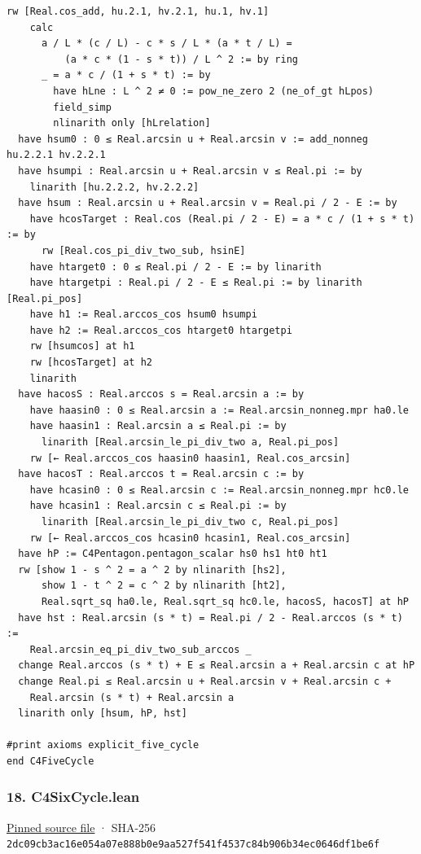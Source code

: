 \documentclass[11pt,a4paper]{article}
\begin{document}
\begin{Verbatim}[breaklines,breakanywhere,fontsize=\footnotesize]
    rw [Real.cos_add, hu.2.1, hv.2.1, hu.1, hv.1]
    calc
      a / L * (c / L) - c * s / L * (a * t / L) =
          (a * c * (1 - s * t)) / L ^ 2 := by ring
      _ = a * c / (1 + s * t) := by
        have hLne : L ^ 2 ≠ 0 := pow_ne_zero 2 (ne_of_gt hLpos)
        field_simp
        nlinarith only [hLrelation]
  have hsum0 : 0 ≤ Real.arcsin u + Real.arcsin v := add_nonneg hu.2.2.1 hv.2.2.1
  have hsumpi : Real.arcsin u + Real.arcsin v ≤ Real.pi := by
    linarith [hu.2.2.2, hv.2.2.2]
  have hsum : Real.arcsin u + Real.arcsin v = Real.pi / 2 - E := by
    have hcosTarget : Real.cos (Real.pi / 2 - E) = a * c / (1 + s * t) := by
      rw [Real.cos_pi_div_two_sub, hsinE]
    have htarget0 : 0 ≤ Real.pi / 2 - E := by linarith
    have htargetpi : Real.pi / 2 - E ≤ Real.pi := by linarith [Real.pi_pos]
    have h1 := Real.arccos_cos hsum0 hsumpi
    have h2 := Real.arccos_cos htarget0 htargetpi
    rw [hsumcos] at h1
    rw [hcosTarget] at h2
    linarith
  have hacosS : Real.arccos s = Real.arcsin a := by
    have haasin0 : 0 ≤ Real.arcsin a := Real.arcsin_nonneg.mpr ha0.le
    have haasin1 : Real.arcsin a ≤ Real.pi := by
      linarith [Real.arcsin_le_pi_div_two a, Real.pi_pos]
    rw [← Real.arccos_cos haasin0 haasin1, Real.cos_arcsin]
  have hacosT : Real.arccos t = Real.arcsin c := by
    have hcasin0 : 0 ≤ Real.arcsin c := Real.arcsin_nonneg.mpr hc0.le
    have hcasin1 : Real.arcsin c ≤ Real.pi := by
      linarith [Real.arcsin_le_pi_div_two c, Real.pi_pos]
    rw [← Real.arccos_cos hcasin0 hcasin1, Real.cos_arcsin]
  have hP := C4Pentagon.pentagon_scalar hs0 hs1 ht0 ht1
  rw [show 1 - s ^ 2 = a ^ 2 by nlinarith [hs2],
      show 1 - t ^ 2 = c ^ 2 by nlinarith [ht2],
      Real.sqrt_sq ha0.le, Real.sqrt_sq hc0.le, hacosS, hacosT] at hP
  have hst : Real.arcsin (s * t) = Real.pi / 2 - Real.arccos (s * t) :=
    Real.arcsin_eq_pi_div_two_sub_arccos _
  change Real.arccos (s * t) + E ≤ Real.arcsin a + Real.arcsin c at hP
  change Real.pi ≤ Real.arcsin u + Real.arcsin v + Real.arcsin c +
    Real.arcsin (s * t) + Real.arcsin a
  linarith only [hsum, hP, hst]

#print axioms explicit_five_cycle
end C4FiveCycle
\end{Verbatim}

\subsubsection{18. C4SixCycle.lean}\label{c4sixcycle.lean}

\href{https://github.com/mpelteshki/climbing-to-the-frontier/blob/29fbb70da18564048f62492e43870f2f96a65463/cagent/p1/C4SixCycle.lean}{Pinned source file} · SHA-256 \texttt{2dc09cb3\allowbreak{}ac16e054\allowbreak{}a07e888b\allowbreak{}0e9aa527\allowbreak{}f541f453\allowbreak{}7c84b906\allowbreak{}b34ec064\allowbreak{}6df1be6f}
\end{document}
